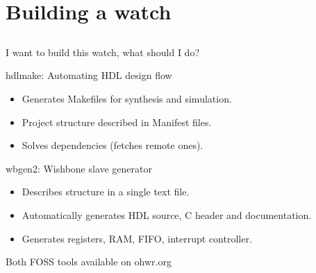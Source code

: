 \documentclass[compress,red]{beamer}
\begin{document}
\section{Building a watch}

\subsection*{} %

\begin{frame}{I want to build this watch, what should I do?}

  \begin{block}{hdlmake: Automating HDL design flow}
    \begin{itemize}
    \item Generates Makefiles for synthesis and simulation.
    \item Project structure described in Manifest files.
    \item Solves dependencies (fetches remote ones).
    \end{itemize}
  \end{block}

  \begin{block}{wbgen2: Wishbone slave generator}
    \begin{itemize}
    \item Describes structure in a single text file.
    \item Automatically generates HDL source, C header and documentation.
    \item Generates registers, RAM, FIFO, interrupt controller.
    \end{itemize}
  \end{block}

  \begin{block}{}
    \begin{center}
      Both FOSS tools available on ohwr.org
    \end{center}
  \end{block}

  \note[item]{}

\end{frame}


\end{document}
